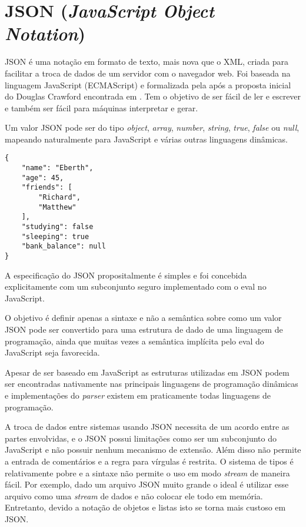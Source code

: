 \section{JSON (\textit{JavaScript Object Notation})}

JSON é uma notação em formato de texto, mais nova que o XML, criada para facilitar a troca de 
dados de um servidor com o navegador web. Foi baseada na linguagem JavaScript (ECMAScript) e formalizada 
pela  após a proposta inicial do Douglas Crawford encontrada em .
Tem o objetivo de ser fácil de ler e escrever e também ser fácil para máquinas interpretar e gerar.

Um valor JSON pode ser do tipo \textit{object}, \textit{array}, \textit{number}, \textit{string}, 
\textit{true}, \textit{false} ou \textit{null}, mapeando naturalmente para JavaScript e várias outras linguagens
dinâmicas.

\begin{lstlisting}[caption=Exemplo de JSON,label={lst:jsonobj}]
{
    "name": "Eberth",
    "age": 45,
    "friends": [
        "Richard",
        "Matthew"
    ],
    "studying": false
    "sleeping": true
    "bank_balance": null
}
\end{lstlisting}

A especificação do JSON propositalmente é simples e foi concebida explicitamente
com um subconjunto seguro implementado com o eval no JavaScript. 

O objetivo é definir apenas a sintaxe e não a semântica sobre como um valor JSON pode 
ser convertido para uma estrutura de dado de uma linguagem de programação, ainda que
muitas vezes a semântica implícita pelo eval do JavaScript seja favorecida.

Apesar de ser baseado em JavaScript as estruturas utilizadas em JSON podem ser encontradas 
nativamente nas principais linguagens de programação dinâmicas e implementações do \textit{parser}
existem em praticamente todas linguagens de programação.

A troca de dados entre sistemas usando JSON necessita de um acordo entre as partes envolvidas, e o JSON
possui limitações como ser um subconjunto do JavaScript e não possuir nenhum mecanismo de extensão.
Além disso não permite a entrada de comentários e a regra para vírgulas é restrita. O sistema de tipos 
é relativamente pobre e a sintaxe não permite o uso em modo \textit{stream} de maneira fácil. Por exemplo,
dado um arquivo JSON muito grande o ideal é utilizar esse arquivo como uma \textit{stream} de dados e não colocar 
ele todo em memória. Entretanto, devido a notação de objetos e listas isto se torna mais custoso em JSON.

